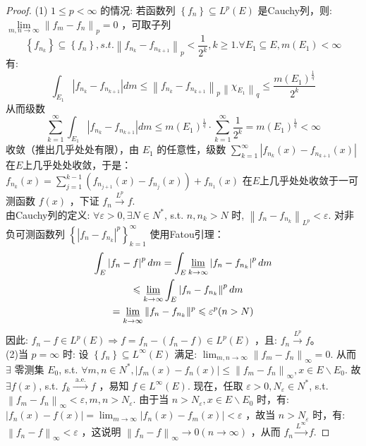 \documentclass[lang=cn,newtx,10pt,scheme=chinese,thmcnt=chapter]{elegantbook}
\begin{document}
\begin{proof}
(1) $1 \leqslant p<\infty$ 的情况: 若函数列 $\left\{f_n\right\} \subseteq L^p(E)$ 是Cauchy列，则:
$\lim \limits_{m, n \rightarrow \infty}\left\|f_m-f_n\right\|_p=0$ ，可取子列
\[\left\{f_{n_k}\right\} \subseteq\left\{f_n\right\}, s.t. \left\|f_{n_k}-f_{n_{k+1}}\right\|_p<\frac{1}{2^k}, k \geq 1 . \forall E_1 \subseteq E, m\left(E_1\right)<\infty\]
有:
\[\int_{E_1}\left|f_{n_k}-f_{n_{k+1}}\right| d m \leqslant\left\|f_{n_k}-f_{n_{k+1}}\right\|_p\left\|\chi_{E_1}\right\|_q \leqslant \frac{m\left(E_1\right)^{\frac{1}{q}}}{2^k}\] 从而级数 \[\sum_{k=1}^{\infty} \int_{E_1}\left|f_{n_k}-f_{n_{k+1}}\right| d m \leqslant m\left(E_1\right)^{\frac{1}{q}} \cdot \sum_{k=1}^{\infty} \frac{1}{2^k}=m\left(E_1\right)^{\frac{1}{q}}<\infty\]
收敛（推出几乎处处有限），由 $E_1$ 的任意性，级数 $\sum_{k=1}^{\infty}\left|f_{n_k}(x)-f_{n_{k+1}}(x)\right|$ 在$E$上几乎处处收敛，于是：
$f_{n_k}(x)=\sum\limits_{j=1}^{k-1}\left(f_{n_{j+1}}(x)-f_{n_j}(x)\right)+f_{n_1}(x)$ 在$E$上几乎处处收敛于一可测函数 $f(x)$ ，下证 $f_n \xrightarrow{L^p} f$.\\
由Cauchy列的定义: $\forall \varepsilon>0, \exists N \in N ^*$, s.t. $n, n_k>N$ 时, $\left\|f_n-f_{n_k}\right\|_{L^p}<\varepsilon$.
对非负可测函数列 $\left\{\left|f_n-f_{n_k}\right|^p\right\}_{k=1}^{\infty}$ 使用Fatou引理：
\begin{equation*}
\begin{gathered}
\int_E\left|f_n-f\right|^p d m=\int_E \varliminf_{k\to\infty}\left|f_n-f_{n_k}\right|^p d m \\
\quad \leqslant \varliminf_{k \rightarrow \infty} \int_E\left|f_n-f_{n_k}\right\|^p d m \\
=\varliminf_{k \rightarrow \infty} \| f_n-f_{n_k}\|^p \leqslant \varepsilon^p(n>N)
\end{gathered}
\end{equation*}
因此: $f_n-f \in L^p(E) \Rightarrow f=f_n-\left(f_n-f\right) \in L^p(E)$ ，且: $f_n \xrightarrow{L^p} f$。\\
(2)当 $p=\infty$ 时: 设 $\left\{f_n\right\} \subseteq L^{\infty}(E)$ 满足: $\lim _{m, n \rightarrow \infty}\left\|f_m-f_n\right\|_{\infty}=0$.
从而 $\exists$ 零测集 $E_0$, s.t. $\forall m, n \in N ^*,\left|f_m(x)-f_n(x)\right| \leqslant\left\|f_m-f_n\right\|_{\infty}, x \in E \backslash E_0$. 故$\exists f(x)$, s.t. $f_k \xrightarrow{\text { a.e. }} f$ ，易知 $f \in L^{\infty}(E)$.
现在，任取 $\varepsilon>0, N_{\varepsilon} \in N ^*$, s.t. $\left\|f_m-f_n\right\|_{\infty}<\varepsilon, m, n>N_{\varepsilon}$.
由于当 $n>N_{\varepsilon}, x \in E \backslash E_0$ 时，有: $\left|f_n(x)-f(x)\right|=\lim _{m \rightarrow \infty}\left|f_n(x)-f_m(x)\right|<\varepsilon$ ，故当 $n>N_{\varepsilon}$ 时，有: $\left\|f_n-f\right\|_{\infty}<\varepsilon$ ，这说明 $\left\|f_n-f\right\|_{\infty} \rightarrow 0(n \rightarrow \infty)$ ，从而 $f_n \xrightarrow{L^{\infty}} f$.
\end{proof}
\end{document}
